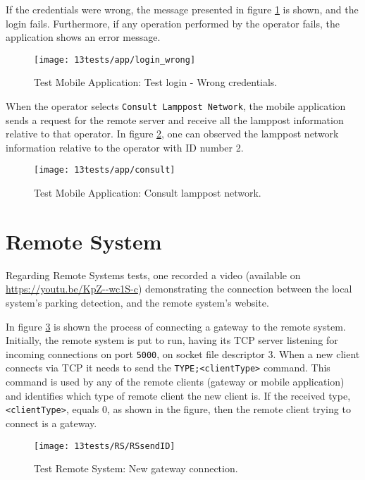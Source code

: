 If the credentials were wrong, the message presented in figure \ref{fig:login_wrong} is shown, and the login fails. Furthermore, if any operation performed by the operator fails, the application shows an error message.

\begin{figure}[H]
	\centering	
	\texttt{[image: 13tests/app/login\_wrong]}
	\caption{Test Mobile Application: Test login - Wrong credentials.}
	\label{fig:login_wrong}
\end{figure}

When the operator selects \verb|Consult Lamppost Network|, the mobile application sends a request for the remote server and receive all the lamppost information relative to that operator. In figure \ref{fig:consult}, one can observed the lamppost network information relative to the operator with ID number 2.

\begin{figure}[H]
	\centering	
	\texttt{[image: 13tests/app/consult]}
	\caption{Test Mobile Application: Consult lamppost network.}
	\label{fig:consult}
\end{figure}

\section{Remote System}

Regarding Remote Systems tests, one recorded a video (available on \linebreak \url{https://youtu.be/KpZ--wc1S-c}) demonstrating the connection between the local system's parking detection, and the remote system's website.

In figure \ref{fig:rsnewgateway} is shown the process of connecting a gateway to the remote system. Initially, the remote system is put to run, having its TCP server listening for incoming connections on port \verb|5000|, on socket file descriptor 3. When a new client connects via TCP it needs to send the \verb|TYPE;<clientType>| command. This command is used by any of the remote clients (gateway or mobile application) and identifies which type of remote client the new client is. If the received type, \verb|<clientType>|, equals 0, as shown in the figure, then the remote client trying to connect is a gateway.

\begin{figure}[H]
	\centering	
	\texttt{[image: 13tests/RS/RSsendID]}
	\caption{Test Remote System: New gateway connection.}
	\label{fig:rsnewgateway}
\end{figure}

